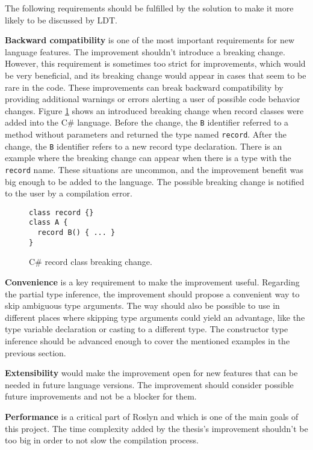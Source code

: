 The following requirements should be fulfilled by the solution to make it more likely to be discussed by \ac{LDT}.
\par
\textbf{Backward compatibility} is one of the most important requirements for new language features. 
The improvement shouldn’t introduce a breaking change. However, this requirement is sometimes too strict for improvements, which would be very beneficial, and its breaking change would appear in cases that seem to be rare in the code. 
These improvements can break backward compatibility by providing additional warnings or errors alerting a user of possible code behavior changes.
Figure \ref{img39:brkCh} shows an introduced breaking change when record classes were added into the C\# language. 
Before the change, the \texttt{B} identifier referred to a method without parameters and returned the type named \texttt{record}. 
After the change, the \texttt{B} identifier refers to a new record type declaration. 
There is an example where the breaking change can appear when there is a type with the \texttt{record} name. 
These situations are uncommon, and the improvement benefit was big enough to be added to the language. 
The possible breaking change is notified to the user by a compilation error.
\begin{figure}[h]
\begin{lstlisting}[style=csharp]
class record {}
class A {
  record B() { ... }
}
\end{lstlisting}
\caption{C\# record class breaking change.}
\label{img39:brkCh}
\end{figure}
\par
\textbf{Convenience} is a key requirement to make the improvement useful. 
Regarding the partial type inference, the improvement should propose a convenient way to skip ambiguous type arguments. 
The way should also be possible to use in different places where skipping type arguments could yield an advantage, like the type variable declaration or casting to a different type. 
The constructor type inference should be advanced enough to cover the mentioned examples in the previous section.
\par
\textbf{Extensibility} would make the improvement open for new features that can be needed in future language versions. 
The improvement should consider possible future improvements and not be a blocker for them.
\par
\textbf{Performance} is a critical part of Roslyn and which is one of the main goals of this project.
The time complexity added by the thesis’s improvement shouldn’t be too big in order to not slow the compilation process.


